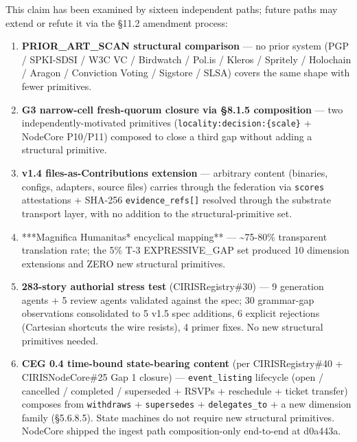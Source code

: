\documentclass[10pt]{article}
\begin{document}
This claim has been examined by sixteen independent paths; future paths may extend or refute it via the §11.2 amendment process:


\begin{enumerate}\setlength\itemsep{0pt}
\item \textbf{PRIOR\_ART\_SCAN structural comparison} — no prior system (PGP / SPKI-SDSI / W3C VC / Birdwatch / Pol.is / Kleros / Spritely / Holochain / Aragon / Conviction Voting / Sigstore / SLSA) covers the same shape with fewer primitives.
\item \textbf{G3 narrow-cell fresh-quorum closure via §8.1.5 composition} — two independently-motivated primitives (\texttt{locality:decision:\{scale\}} + NodeCore P10/P11) composed to close a third gap without adding a structural primitive.
\item \textbf{v1.4 files-as-Contributions extension} — arbitrary content (binaries, configs, adapters, source files) carries through the federation via \texttt{scores} attestations + SHA-256 \texttt{evidence\_refs[]} resolved through the substrate transport layer, with no addition to the structural-primitive set.
\item ***Magnifica Humanitas* encyclical mapping** — \textasciitilde{}75-80\% transparent translation rate; the 5\% T-3 EXPRESSIVE\_GAP set produced 10 dimension extensions and ZERO new structural primitives.
\item \textbf{283-story authorial stress test} (CIRISRegistry\#30) — 9 generation agents + 5 review agents validated against the spec; 30 grammar-gap observations consolidated to 5 v1.5 spec additions, 6 explicit rejections (Cartesian shortcuts the wire resists), 4 primer fixes. No new structural primitives needed.
\item \textbf{CEG 0.4 time-bound state-bearing content} (per CIRISRegistry\#40 + CIRISNodeCore\#25 Gap 1 closure) — \texttt{event\_listing} lifecycle (open / cancelled / completed / superseded + RSVPs + reschedule + ticket transfer) composes from \texttt{withdraws} + \texttt{supersedes} + \texttt{delegates\_to} + a new dimension family (§5.6.8.5). State machines do not require new structural primitives. NodeCore shipped the ingest path composition-only end-to-end at d0a443a.

\end{enumerate}
\end{document}

